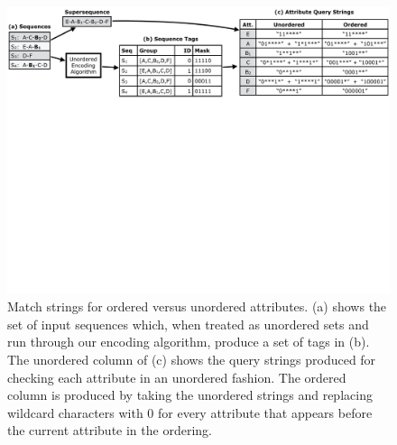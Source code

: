 \begin{figure}[t!]
\includegraphics[trim={0 18cm 0 0}, clip, width=\textwidth]{figures/ordered_match_strings}
\caption{Match strings for ordered versus unordered attributes. (a) shows the set of input sequences which, when treated as unordered sets and run through our encoding algorithm, produce a set of tags in (b). The unordered column of (c) shows the query strings produced for checking each attribute in an unordered fashion. The ordered column is produced by taking the unordered strings and replacing wildcard characters with 0 for every attribute that appears before the current attribute in the ordering.}
\label{fig:ordered_rules}
\end{figure}

